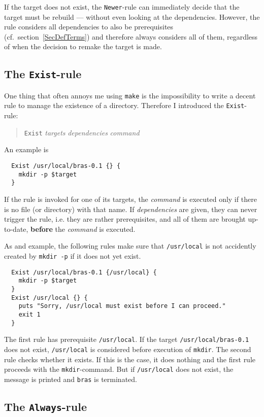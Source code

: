 \documentclass[12pt]{article}
\newcommand{\bras}{\texttt{bras}}
\newcommand{\make}{\texttt{make}}
\begin{document}
If the target does not exist, the \texttt{Newer}-rule can immediately
decide that the target must be rebuild --- without even looking at the
dependencies. However, the rule considers all dependencies to also be
prerequisites (cf.\ section~\ref{SecDefTerms}) and therefore always
considers all of them, regardless of when the decision to remake the
target is made.

\subsection{The \texttt{Exist}-rule}

One thing that often annoys me using \make{} is the impossibility to
write a decent rule to manage the existence of a directory. Therefore
I introduced the \texttt{Exist}-rule:
\begin{quote}
  \texttt{Exist} \textit{targets} \textit{dependencies} \textit{command}
\end{quote}
An example is
\begin{verbatim}
  Exist /usr/local/bras-0.1 {} {
    mkdir -p $target
  }
\end{verbatim}
If the rule is invoked for one of its targets, the \textit{command} is
executed only if there is no file (or directory) with that name. If
\textit{dependencies} are given, they can never trigger the
rule, i.e. they are rather prerequisites, and all of them are brought
up-to-date, \textbf{before} the \textit{command} is executed.

As and example, the following rules make sure that
\texttt{/usr/local} is not accidently created by \texttt{mkdir -p} if
it does not yet exist.

\begin{verbatim}
  Exist /usr/local/bras-0.1 {/usr/local} {
    mkdir -p $target
  }
  Exist /usr/local {} {
    puts "Sorry, /usr/local must exist before I can proceed."
    exit 1
  }	
\end{verbatim}
The first rule has prerequisite \texttt{/usr/local}. If the target
\texttt{/usr/local/bras-0.1}
does not exist, \texttt{/usr/local} is considered
before execution of \texttt{mkdir}. The second rule checks whether it
exists. If this is the case, it does nothing and the first rule
proceeds with the \texttt{mkdir}-command. But if
\texttt{/usr/local} does not exist, the message is printed and \bras{}
is terminated.

\subsection{The \texttt{Always}-rule}
\end{document}
